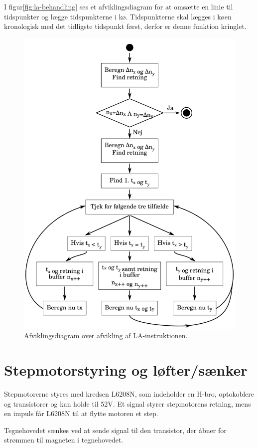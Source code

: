 I figur\vref{fig:la-behandling} ses et afviklingsdiagram for at
omsætte en linie til tidspunkter og lægge tidspunkterne i
kø. Tidspunkterne skal lægges i køen kronologisk med det tidligste
tidspunkt først, derfor er denne funktion kringlet.

\begin{figure}[htbp]
  \centering
  \includegraphics[width=.75\textwidth]{./img/la-behandling}
  \caption{Afviklingsdiagram over afvikling af LA-instruktionen.}
  \label{fig:la-behandling}
\end{figure}


\section{Stepmotorstyring og løfter/sænker}


Stepmotorerne styres med kredsen L6208N, som indeholder en H-bro,
optokoblere og transistorer og kan holde til 52V. Et signal styrer
stepmotorens retning, mens en impuls får L6208N til at flytte motoren
et step.

Tegnehovedet sænkes ved at sende signal til den transistor, der åbner
for strømmen til magneten i tegnehovedet.


